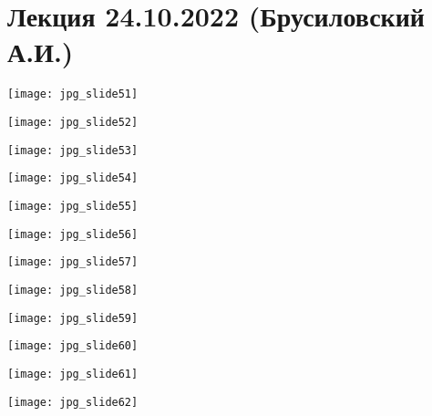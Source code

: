 \documentclass[main.tex]{subfiles}
\begin{document}
\section{Лекция 24.10.2022 (Брусиловский А.И.)}

\begin{center}
\texttt{[image: jpg\_slide51]}
\end{center}

\begin{center}
\texttt{[image: jpg\_slide52]}
\end{center}

\begin{center}
\texttt{[image: jpg\_slide53]}
\end{center}

\begin{center}
\texttt{[image: jpg\_slide54]}
\end{center}

\begin{center}
\texttt{[image: jpg\_slide55]}
\end{center}

\begin{center}
\texttt{[image: jpg\_slide56]}
\end{center}

\begin{center}
\texttt{[image: jpg\_slide57]}
\end{center}

\begin{center}
\texttt{[image: jpg\_slide58]}
\end{center}

\begin{center}
\texttt{[image: jpg\_slide59]}
\end{center}

\begin{center}
\texttt{[image: jpg\_slide60]}
\end{center}

\begin{center}
\texttt{[image: jpg\_slide61]}
\end{center}

\begin{center}
\texttt{[image: jpg\_slide62]}
\end{center}
\end{document}
